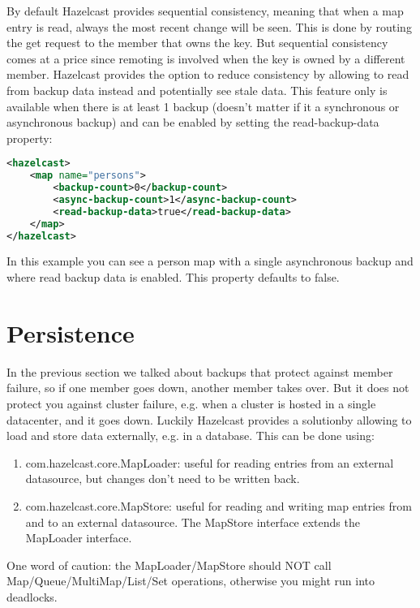 By default Hazelcast provides sequential consistency, meaning that when a map entry is read, always the most recent change will be seen. This is done by routing the get request to the member that owns the key. But sequential consistency comes at a price since remoting is involved when the key is owned by a different member. Hazelcast provides the option to reduce consistency by allowing to read from backup data instead and potentially see stale data. This feature only is available when there is at least 1 backup (doesn't matter if it a synchronous or asynchronous backup) and can be enabled by setting the read-backup-data property:
\begin{lstlisting}[language=xml]
<hazelcast>
    <map name="persons">
        <backup-count>0</backup-count>
        <async-backup-count>1</async-backup-count>
        <read-backup-data>true</read-backup-data>
    </map>
</hazelcast>
\end{lstlisting}
In this example you can see a person map with a single asynchronous backup and where read backup data is enabled. This property defaults to false.

\section{Persistence}
In the previous section we talked about backups that protect against member failure, so if one member goes down, another member takes over. But it does not protect you against cluster failure, e.g. when a cluster is hosted in a single datacenter, and it goes down. Luckily Hazelcast provides a solutionby allowing to load and store data externally, e.g. in a database. This can be done using:
\begin{enumerate}
\item com.hazelcast.core.MapLoader: useful for reading entries from an external datasource, but changes don't need to be written back.
\item com.hazelcast.core.MapStore: useful for reading and writing map entries from and to an external datasource. The MapStore interface extends the MapLoader interface.
\end{enumerate}
One word of caution: the MapLoader/MapStore should NOT call Map/Queue/MultiMap/List/Set operations, otherwise you might run into deadlocks.

